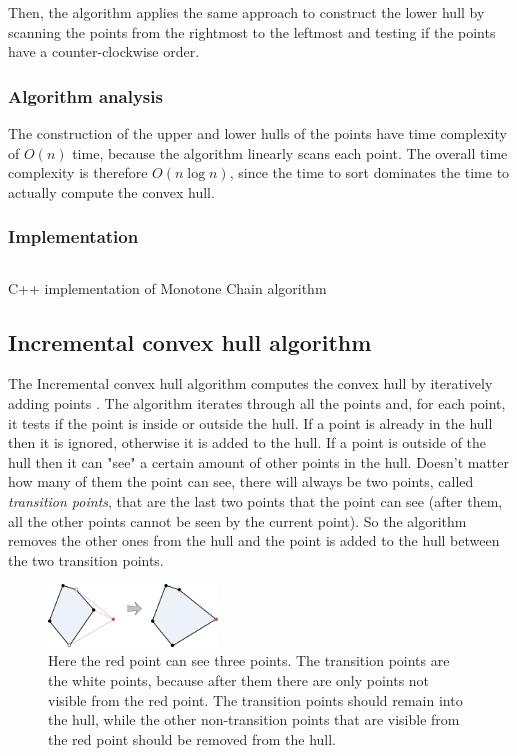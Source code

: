 \documentclass{article}
\begin{document}
Then, the algorithm applies the same approach to construct the lower hull by scanning the points from the rightmost to the leftmost and testing if the points have a counter-clockwise order.

\subsubsection*{Algorithm analysis}
The construction of the upper and lower hulls of the points have time complexity of $O(n)$ time, because the algorithm linearly scans each point.
The overall time complexity is therefore $O(n\log{n})$, since the time to sort dominates the time to actually compute the convex hull.

\subsubsection*{Implementation}
\begin{listing}[H]
    \inputminted[linenos]{cpp}{code/monotonechain.cpp}
    \caption{C++ implementation of Monotone Chain algorithm}
\end{listing}

\newpage
\subsection{Incremental convex hull algorithm}

The Incremental convex hull algorithm computes the convex hull by iteratively adding points \cite{incremental}. The algorithm iterates through all the points and, for each point, it tests if the point is inside or outside the hull. If a point is already in the hull then it is ignored, otherwise it is added to the hull. If a point is outside of the hull then it can "see" a certain amount of other points in the hull. Doesn't matter how many of them the point can see, there will always be two points, called \textit{transition points}, that are the last two points that the point can see (after them, all the other points cannot be seen by the current point). So the algorithm removes the other ones from the hull and the point is added to the hull between the two transition points.

\begin{figure}[h]
\centering
\includegraphics[width=0.4\textwidth]{incremental/incremental_visual_visible.png}
\caption{\label{fig:incremental_visual_visible}Here the red point can see three points. The transition points are the white points, because after them there are only points not visible from the red point. The transition points should remain into the hull, while the other non-transition points that are visible from the red point should be removed from the hull.}
\end{figure}
\end{document}
